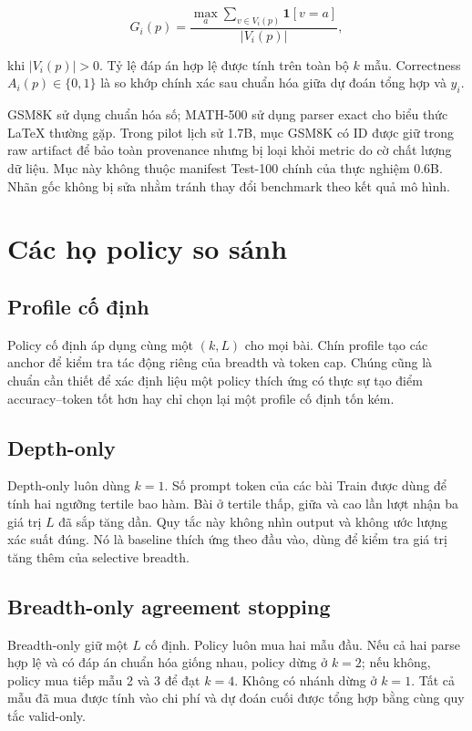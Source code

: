 \begin{equation}
  G_i(p)=\frac{\max_a \sum_{v\in V_i(p)}\mathbf{1}[v=a]}{|V_i(p)|},
\end{equation}

khi $|V_i(p)|>0$. Tỷ lệ đáp án hợp lệ được tính trên toàn bộ $k$ mẫu. Correctness
$A_i(p)\in\{0,1\}$ là so khớp chính xác sau chuẩn hóa giữa dự đoán tổng hợp và $y_i$.

GSM8K sử dụng chuẩn hóa số; MATH-500 sử dụng parser exact cho biểu thức LaTeX thường
gặp. Trong pilot lịch sử 1.7B, mục GSM8K có ID  được giữ
trong raw artifact để bảo toàn provenance nhưng bị loại khỏi metric do cờ chất
lượng dữ liệu. Mục này không thuộc manifest Test-100 chính của thực nghiệm 0.6B.
Nhãn gốc không bị sửa nhằm tránh thay đổi benchmark theo kết quả mô hình.

\section{Các họ policy so sánh}

\subsection{Profile cố định}

Policy cố định áp dụng cùng một $(k,L)$ cho mọi bài. Chín profile tạo các anchor để
kiểm tra tác động riêng của breadth và token cap. Chúng cũng là chuẩn cần thiết để
xác định liệu một policy thích ứng có thực sự tạo điểm accuracy--token tốt hơn hay chỉ
chọn lại một profile cố định tốn kém.

\subsection{Depth-only}

Depth-only luôn dùng $k=1$. Số prompt token của các bài Train được dùng để tính hai
ngưỡng tertile bao hàm. Bài ở tertile thấp, giữa và cao lần lượt nhận ba giá trị $L$
đã sắp tăng dần. Quy tắc này không nhìn output và không ước lượng xác suất đúng. Nó là
baseline thích ứng theo đầu vào, dùng để kiểm tra giá trị tăng thêm của selective
breadth.

\subsection{Breadth-only agreement stopping}

Breadth-only giữ một $L$ cố định. Policy luôn mua hai mẫu đầu. Nếu cả hai parse hợp lệ
và có đáp án chuẩn hóa giống nhau, policy dừng ở $k=2$; nếu không, policy mua tiếp mẫu
2 và 3 để đạt $k=4$. Không có nhánh dừng ở $k=1$. Tất cả mẫu đã mua được tính vào chi
phí và dự đoán cuối được tổng hợp bằng cùng quy tắc valid-only.

